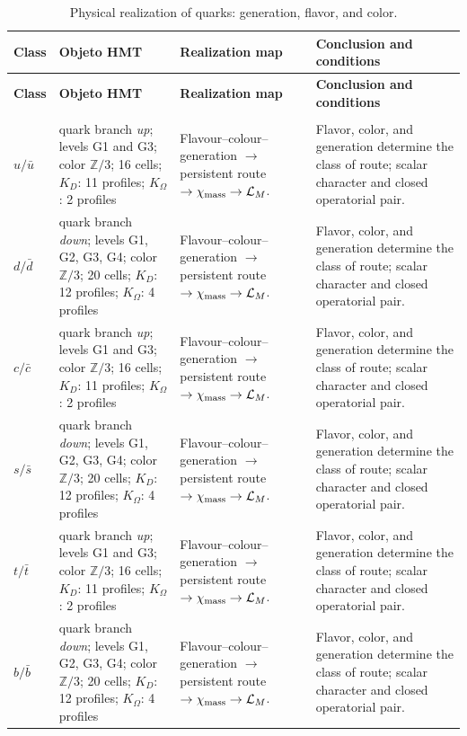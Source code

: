 \begingroup
\setlength{\tabcolsep}{4.5pt}
\renewcommand{\arraystretch}{1.28}
\begin{longtable}{@{}>{\raggedright\arraybackslash}p{}>{\raggedright\arraybackslash}p{}>{\raggedright\arraybackslash}p{}>{\raggedright\arraybackslash}p{}@{}}
\caption{Physical realization of quarks: generation, flavor, and color.}\label{tab:masas-realizacion-quarks}\\
\toprule
\textbf{Class} & \textbf{Objeto HMT} & \textbf{Realization map} & \textbf{Conclusion and conditions} \\
\midrule
\endfirsthead
\toprule
\textbf{Class} & \textbf{Objeto HMT} & \textbf{Realization map} & \textbf{Conclusion and conditions} \\
\midrule
\endhead
\midrule
\multicolumn{4}{r}{\footnotesize Continues on the following page.}\\
\endfoot
\bottomrule
\endlastfoot
$u/\bar u$ & quark branch \emph{up}; levels G1 and G3; color $\mathbb Z/3$; 16 cells; $K_D$: 11 profiles; $K_\Omega$: 2 profiles & Flavour--colour--generation $\to$ persistent route $\to\chi_{\rm mass}\to\mathcal L_M$. & Flavor, color, and generation determine the class of route; scalar character and closed operatorial pair. \\
$d/\bar d$ & quark branch \emph{down}; levels G1, G2, G3, G4; color $\mathbb Z/3$; 20 cells; $K_D$: 12 profiles; $K_\Omega$: 4 profiles & Flavour--colour--generation $\to$ persistent route $\to\chi_{\rm mass}\to\mathcal L_M$. & Flavor, color, and generation determine the class of route; scalar character and closed operatorial pair. \\
$c/\bar c$ & quark branch \emph{up}; levels G1 and G3; color $\mathbb Z/3$; 16 cells; $K_D$: 11 profiles; $K_\Omega$: 2 profiles & Flavour--colour--generation $\to$ persistent route $\to\chi_{\rm mass}\to\mathcal L_M$. & Flavor, color, and generation determine the class of route; scalar character and closed operatorial pair. \\
$s/\bar s$ & quark branch \emph{down}; levels G1, G2, G3, G4; color $\mathbb Z/3$; 20 cells; $K_D$: 12 profiles; $K_\Omega$: 4 profiles & Flavour--colour--generation $\to$ persistent route $\to\chi_{\rm mass}\to\mathcal L_M$. & Flavor, color, and generation determine the class of route; scalar character and closed operatorial pair. \\
$t/\bar t$ & quark branch \emph{up}; levels G1 and G3; color $\mathbb Z/3$; 16 cells; $K_D$: 11 profiles; $K_\Omega$: 2 profiles & Flavour--colour--generation $\to$ persistent route $\to\chi_{\rm mass}\to\mathcal L_M$. & Flavor, color, and generation determine the class of route; scalar character and closed operatorial pair. \\
$b/\bar b$ & quark branch \emph{down}; levels G1, G2, G3, G4; color $\mathbb Z/3$; 20 cells; $K_D$: 12 profiles; $K_\Omega$: 4 profiles & Flavour--colour--generation $\to$ persistent route $\to\chi_{\rm mass}\to\mathcal L_M$. & Flavor, color, and generation determine the class of route; scalar character and closed operatorial pair. \\
\end{longtable}
\endgroup
